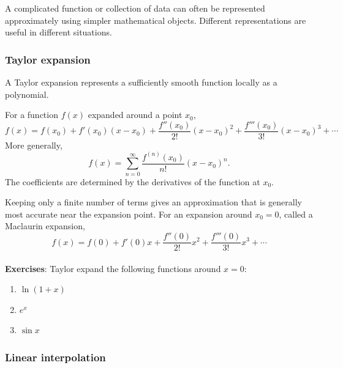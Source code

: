 A complicated function or collection of data can often be represented approximately using simpler mathematical objects.
Different representations are useful in different situations.


\subsubsection{Taylor expansion}

A Taylor expansion represents a sufficiently smooth function locally as a polynomial.

For a function $f(x)$ expanded around a point $x_0$,
% 
\[
    f(x) = f(x_0) + f'(x_0)(x-x_0) + \frac{f''(x_0)}{2!}(x-x_0)^2 + \frac{f'''(x_0)}{3!}(x-x_0)^3 + \cdots
\]
% 
More generally,
% 
\[
    f(x) = \sum_{n=0}^{\infty}\frac{f^{(n)}(x_0)}{n!}(x-x_0)^n.
\]
% 
The coefficients are determined by the derivatives of the function at $x_0$.

Keeping only a finite number of terms gives an approximation that is generally most accurate near the expansion point.
For an expansion around $x_0=0$, called a Maclaurin expansion,
% 
\[
    f(x) = f(0) + f'(0)x + \frac{f''(0)}{2!}x^2 + \frac{f'''(0)}{3!}x^3 + \cdots
\]
% 
% 
\medskip
\\
\textbf{Exercises}: Taylor expand the following functions around $x=0$:

\begin{enumerate}
    \item $\ln(1+x)$
    \item $e^x$
    \item $\sin x$
\end{enumerate}






\subsubsection{Linear interpolation}

